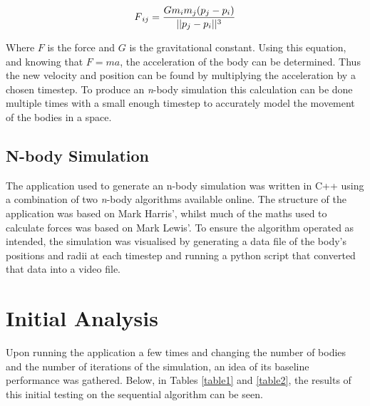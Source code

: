 \documentclass[12pt,journal,transmag]{IEEEtran}
\begin{document}
	\begin{equation} \label{forceeq} 
	F\textsubscript{$ij$} = \dfrac{Gm\textsubscript{$i$}m\textsubscript{$j$}(p\textsubscript{$j$} - p\textsubscript{$i$})}{||p\textsubscript{$j$} - p\textsubscript{$i$}||\textsuperscript{$3$}}
	\end{equation}
	
	Where $F$ is the force and $G$ is the gravitational constant. Using this equation, and knowing that $F = ma$, the acceleration of the body can be determined. Thus the new velocity and position can be found by multiplying the acceleration by a chosen timestep. To produce an \textit{n}-body simulation this calculation can be done multiple times with a small enough timestep to accurately model the movement of the bodies in a space.
	
	\subsection{N-body Simulation}
	The application used to generate an n-body simulation was written in C++ using a combination of two \textit{n}-body algorithms available online. The structure of the application was based on Mark Harris'\cite{harris}, whilst much of the maths used to calculate forces was based on Mark Lewis'\cite{lewis}. To ensure the algorithm operated as intended, the simulation was visualised by generating a data file of the body's positions and radii at each timestep and running a python script that converted that data into a video file.
	
	\section{Initial Analysis}
	Upon running the application a few times and changing the number of bodies and the number of iterations of the simulation, an idea of its baseline performance was gathered. Below, in Tables \ref{table1} and \ref{table2}, the results of this initial testing on the sequential algorithm can be seen.
	
	\begin{table}[!h]
		\caption{1000 Iteration Sequential Algorithm Performance}
		\label{table1}
		\centering
	\end{table}
\end{document}
